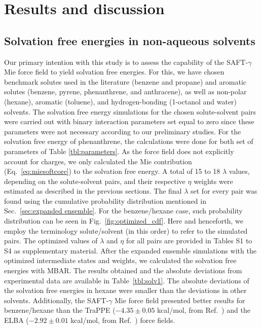 \documentclass[preprint]{elsarticle}
\begin{document}
	\section{Results and discussion}
	\label{sec:results}
	
	\subsection{Solvation free energies in non-aqueous solvents}
	\label{sec:non-aqueous}
	
	Our primary intention with this study is to assess the capability of the SAFT-$\gamma$ Mie force field to yield solvation free energies. For this, we have chosen benchmark solutes used in the literature (benzene and propane) and aromatic solutes (benzene, pyrene, phenanthrene, and anthracene), as well as non-polar (hexane), aromatic (toluene), and hydrogen-bonding (1-octanol and water) solvents. The solvation free energy simulations for the chosen solute-solvent pairs were carried out with binary interaction parameters set equal to zero since these parameters were not necessary according to our preliminary studies. For the solvation free energy of phenanthrene, the calculations were done for both set of parameters of Table \ref{tbl:parameters}.  As the force field does not explicitly account for charges, we only calculated the Mie contribution (Eq.~\eqref{eq:miesoftcore}) to the solvation free energy. A total of 15 to 18 $\lambda$ values, depending on the solute-solvent pairs, and their respective $\eta$ weights were estimated as described in the previous sections. The final $\lambda$ set for every pair was found using the cumulative probability distribution mentioned in Sec.~\ref{sec:expanded ensemble}. For the benzene/hexane case, such probability distribution can be seen in Fig.~\ref{fig:optimized_cdf}. Here and henceforth, we employ the terminology solute/solvent (in this order) to refer to the simulated pairs. The optimized values of $\lambda$ and $\eta$ for all pairs are provided in Tables S1 to S4 as supplementary material.
	After the expanded ensemble simulations with the optimized intermediate states and weights, we calculated the solvation free energies with MBAR. The results obtained and the absolute deviations from experimental data \cite{doi:10.1021/ci034120c} are available in Table~\ref{tbl:solv1}. The absolute deviations of the solvation free energies in hexane were smaller than the deviations in other solvents.
	Additionally, the SAFT-$\gamma$ Mie force field presented better results for benzene/hexane than the TraPPE ($- 4.35 \pm 0.05$ kcal/mol, from Ref.~) and the ELBA ($-2.92 \pm 0.01$ kcal/mol, from Ref.~) force fields.
\end{document}
